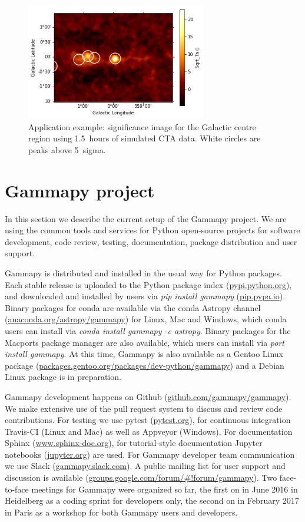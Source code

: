 \documentclass{PoS}
\newcommand{\urlGammapySlack}{\href{https://gammapy.slack.com}{gammapy.slack.com}}
\newcommand{\urlGammapyGithub}{\href{https://github.com/gammapy/gammapy}{github.com/gammapy/gammapy}}
\newcommand{\urlPytest}{\href{https://pytest.org}{pytest.org}}
\newcommand{\urlSphinx}{\href{http://www.sphinx-doc.org}{www.sphinx-doc.org}}
\newcommand{\urlJupyter}{\href{https://jupyter.org}{jupyter.org}}
\newcommand{\urlPypi}{\href{https://pypi.python.org}{pypi.python.org}}
\newcommand{\urlPip}{\href{https://pip.pypa.io}{pip.pypa.io}}
\newcommand{\urlAnacondaGammapy}{\href{https://anaconda.org/astropy/gammapy}{anaconda.org/astropy/gammapy}}
\newcommand{\urlGentooGammapy}{\href{https://packages.gentoo.org/packages/dev-python/gammapy}{packages.gentoo.org/packages/dev-python/gammapy}}
\newcommand{\urlGammapyForum}{\href{https://groups.google.com/forum/\#!forum/gammapy}{groups.google.com/forum/\#!forum/gammapy}}
\begin{document}
\begin{figure}[t]
\centering
\includegraphics[width=0.7\textwidth]{figures/gammapy_example_sky_image.png}
\caption{
Application example: significance image for the Galactic centre region using
1.5~hours of simulated CTA data. White circles are peaks above 5~sigma.
}
\label{fig:app}
\end{figure}

\section{Gammapy project}
\label{sec:project}

In this section we describe the current setup of the Gammapy project. We are using the common tools and services for Python open-source projects for software
development, code review, testing, documentation, package distribution and user
support.

Gammapy is distributed and installed in the usual way for Python packages. Each
stable release is uploaded to the Python package index (\urlPypi), and
downloaded and installed by users via {\it pip install gammapy} (\urlPip).
Binary packages for conda are available via the conda Astropy channel
(\urlAnacondaGammapy) for Linux, Mac and Windows, which conda users can install
via {\it conda install gammapy -c astropy}. Binary packages for the Macports
package manager are also available, which users can install via {\it port
install gammapy}. At this time, Gammapy is also available as a Gentoo Linux
package (\urlGentooGammapy) and a Debian Linux package is in preparation.

Gammapy development happens on Github (\urlGammapyGithub). We make extensive use
of the pull request system to discuss and review code contributions. For testing
we use pytest (\urlPytest), for continuous integration Travis-CI (Linux and Mac)
as well as Appveyor (Windows). For documentation Sphinx (\urlSphinx), for
tutorial-style documentation Jupyter notebooks (\urlJupyter) are used. For
Gammapy developer team communication we use Slack (\urlGammapySlack). A public
mailing list for user support and discussion is available (\urlGammapyForum).
Two face-to-face meetings for Gammapy were organized so far, the first on in
June 2016 in Heidelberg as a coding sprint for developers only, the second on in
February 2017 in Paris as a workshop for both Gammapy users and developers.
\end{document}
